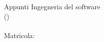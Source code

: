 \documentclass[a4paper]{article}
\def\header#1#2#3#4{
\vspace*{\fill}
  \begin{center}
    { \Large Appunti Ingegneria del software #1}\\ \vspace{10pt}
    {(\ANNO #2)} \\  \vspace{10pt}
{\Large \STUDENT#3} \\  \vspace{10pt}
{\Large Matricola: \MATRICOLA #4} \\  \vspace{10pt}
  \end{center}
  \vspace*{\fill}
}
\begin{document}
\header{}{}{}{}

\pagebreak

	\renewcommand{\contentsname}{Contenuti}
	\renewcommand\tablename{new}
	\tableofcontents \pagebreak

\vspace{30pt}







\end{document}
